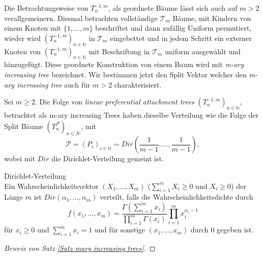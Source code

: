 Die Betrachtungsweise von $T_n^{-1,m}$, als geordnete Bäume lässt sich auch auf $m > 2$ verallgemeinern. Diesmal betrachten vollständige $\mathcal{T}_m$ Bäume, mit Kindern von einem Knoten mit $\{1,...,m\}$ beschriftet und dann zufällig Uniform permutiert, wieder wird $(T_n^{-1,m})_{n \in \mathbb{N}}$ in $\mathcal{T}_m$ eingebettet und in jedem Schritt ein externer Knoten von $(T_n^{-1,m})_{n \in \mathbb{N}}$ mit Beschriftung in $\mathcal{T}_m$ uniform ausgewählt und hinzugefügt. Diese geordnete Konstruktion von einem Baum wird mit \textit{m-ary increasing tree} bezeichnet. Wir bestimmen jetzt den Split Vektor welcher den \textit{m-ary increasing tree} auch für $m >2$ charakterisiert.
\begin{theorem}
    \label{Satz mary increasing trees}
    Sei $m \geq 2$. Die Folge von \textit{linear preferential attachment trees} $(T_n^{-1,m})_{n \in \mathbb{N}}$, betrachtet als m-ary increasing Trees haben dieselbe Verteilung wie die Folge der Split Bäume $(T^\mathcal{P}_n)_{n \in \mathcal{N}}$, mit 
    \[
    \mathcal{P} = (P_i)_{i \in \mathbb{N}} \sim Dir(\frac{1}{m-1},...,\frac{1}{m-1}),
    \]
    wobei mit $Dir$ die Dirichlet-Verteilung gemeint ist.
\end{theorem}

\begin{Definition}\textnormal{Dirichlet-Verteilung}\\
    Ein Wahrscheinlichkeitsvektor $(X_1,...,X_m)$ ($\sum_{i=1}^{m} X_i \geq 0$ und $X_i \geq 0$) der Länge $m$ ist $Dir(\alpha_1,...,\alpha_m)$ verteilt, falls die Wahrscheinlichkeitsdichte durch
    \[
    f(x_1,...,x_m) = \frac{\Gamma(\sum_{i=1}^{m}x_i)}{\prod_{i=1}^{m}\Gamma(x_i)} \prod_{i=1}^{m}x_i^{\alpha_i-1}
    \] 
    für $x_i \geq 0$ und $\sum_{i=1}^{m}x_i = 1$ und für sonstige $(x_1,...,x_m)$ durch $0$ gegeben ist.
\end{Definition}
\begin{proof}[Beweis von Satz \ref{Satz mary increasing trees}]
    
\end{proof}
